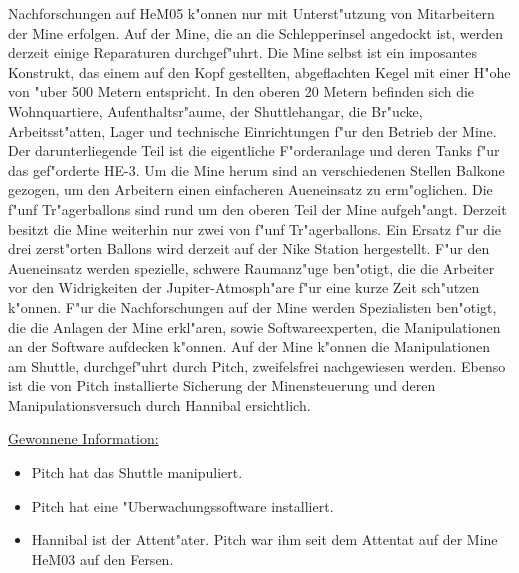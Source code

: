 Nachforschungen auf HeM05 k"onnen nur mit Unterst"utzung von Mitarbeitern der Mine erfolgen. Auf der Mine, die an die Schlepperinsel angedockt ist, werden derzeit einige Reparaturen durchgef"uhrt. Die Mine selbst ist ein imposantes Konstrukt, das einem auf den Kopf gestellten, abgeflachten Kegel mit einer H"ohe von "uber 500 Metern entspricht. In den oberen 20 Metern befinden sich die Wohnquartiere, Aufenthaltsr"aume, der Shuttlehangar, die Br"ucke, Arbeitsst"atten, Lager und technische Einrichtungen f"ur den Betrieb der Mine. Der darunterliegende Teil ist die eigentliche F"orderanlage und deren Tanks f"ur das gef"orderte HE-3. Um die Mine herum sind an verschiedenen Stellen Balkone gezogen, um den Arbeitern einen einfacheren Au\3eneinsatz zu erm"oglichen. Die f"unf Tr"agerballons sind rund um den oberen Teil der Mine aufgeh"angt. Derzeit besitzt die Mine weiterhin nur zwei von f"unf Tr"agerballons. Ein Ersatz f"ur die drei zerst"orten Ballons wird derzeit auf der Nike Station hergestellt. F"ur den Au\3eneinsatz werden spezielle, schwere Raumanz"uge ben"otigt, die die Arbeiter vor den Widrigkeiten der Jupiter-Atmosph"are f"ur eine kurze Zeit sch"utzen k"onnen. F"ur die Nachforschungen auf der Mine werden Spezialisten ben"otigt, die die Anlagen der Mine erkl"aren, sowie Softwareexperten, die Manipulationen an der Software aufdecken k"onnen. Auf der Mine k"onnen die Manipulationen am Shuttle, durchgef"uhrt durch Pitch, zweifelsfrei nachgewiesen werden. Ebenso ist die von Pitch installierte Sicherung der Minensteuerung und deren Manipulationsversuch durch Hannibal ersichtlich.

\begin{remarks}
	\underline{Gewonnene Information:}

	\begin{itemize}
		\item Pitch hat das Shuttle manipuliert.
		\item Pitch hat eine "Uberwachungssoftware installiert.
		\item Hannibal ist der Attent"ater. Pitch war ihm seit dem Attentat auf der Mine HeM03 auf den Fersen.
	\end{itemize}
\end{remarks}
